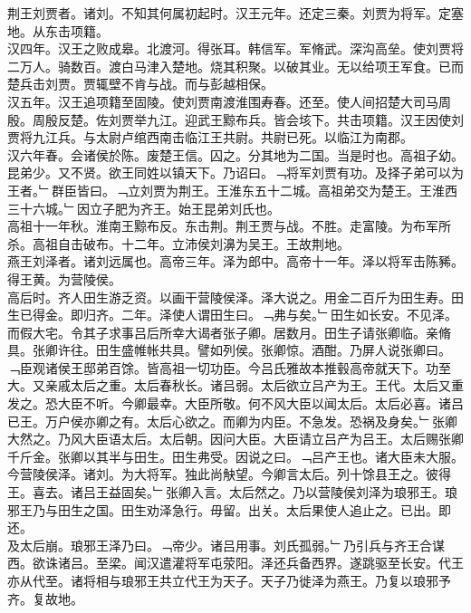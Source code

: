 \documentclass{zhvt-classic}
\begin{document}
\hspace*{2em}荆王刘贾者。诸刘。不知其何属初起时。汉王元年。还定三秦。刘贾为将军。定塞地。从东击项籍。\\
\hspace*{2em}汉四年。汉王之败成皋。北渡河。得张耳。韩信军。军脩武。深沟高垒。使刘贾将二万人。骑数百。渡白马津入楚地。烧其积聚。以破其业。无以给项王军食。已而楚兵击刘贾。贾辄壁不肯与战。而与彭越相保。\\
\hspace*{2em}汉五年。汉王追项籍至固陵。使刘贾南渡淮围寿春。还至。使人间招楚大司马周殷。周殷反楚。佐刘贾举九江。迎武王黥布兵。皆会垓下。共击项籍。汉王因使刘贾将九江兵。与太尉卢绾西南击临江王共尉。共尉已死。以临江为南郡。\\
\hspace*{2em}汉六年春。会诸侯於陈。废楚王信。囚之。分其地为二国。当是时也。高祖子幼。昆弟少。又不贤。欲王同姓以镇天下。乃诏曰。﹁将军刘贾有功。及择子弟可以为王者。﹂群臣皆曰。﹁立刘贾为荆王。王淮东五十二城。高祖弟交为楚王。王淮西三十六城。﹂因立子肥为齐王。始王昆弟刘氏也。\\
\hspace*{2em}高祖十一年秋。淮南王黥布反。东击荆。荆王贾与战。不胜。走富陵。为布军所杀。高祖自击破布。十二年。立沛侯刘濞为吴王。王故荆地。\\
\hspace*{2em}燕王刘泽者。诸刘远属也。高帝三年。泽为郎中。高帝十一年。泽以将军击陈豨。得王黄。为营陵侯。\\
\hspace*{2em}高后时。齐人田生游乏资。以画干营陵侯泽。泽大说之。用金二百斤为田生寿。田生已得金。即归齐。二年。泽使人谓田生曰。﹁弗与矣。﹂田生如长安。不见泽。而假大宅。令其子求事吕后所幸大谒者张子卿。居数月。田生子请张卿临。亲脩具。张卿许往。田生盛帷帐共具。譬如列侯。张卿惊。酒酣。乃屏人说张卿曰。﹁臣观诸侯王邸弟百馀。皆高祖一切功臣。今吕氏雅故本推毂高帝就天下。功至大。又亲戚太后之重。太后春秋长。诸吕弱。太后欲立吕产为王。王代。太后又重发之。恐大臣不听。今卿最幸。大臣所敬。何不风大臣以闻太后。太后必喜。诸吕已王。万户侯亦卿之有。太后心欲之。而卿为内臣。不急发。恐祸及身矣。﹂张卿大然之。乃风大臣语太后。太后朝。因问大臣。大臣请立吕产为吕王。太后赐张卿千斤金。张卿以其半与田生。田生弗受。因说之曰。﹁吕产王也。诸大臣未大服。今营陵侯泽。诸刘。为大将军。独此尚觖望。今卿言太后。列十馀县王之。彼得王。喜去。诸吕王益固矣。﹂张卿入言。太后然之。乃以营陵侯刘泽为琅邪王。琅邪王乃与田生之国。田生劝泽急行。毋留。出关。太后果使人追止之。已出。即还。\\
\hspace*{2em}及太后崩。琅邪王泽乃曰。﹁帝少。诸吕用事。刘氏孤弱。﹂乃引兵与齐王合谋西。欲诛诸吕。至梁。闻汉遣灌将军屯荥阳。泽还兵备西界。遂跳驱至长安。代王亦从代至。诸将相与琅邪王共立代王为天子。天子乃徙泽为燕王。乃复以琅邪予齐。复故地。\\
\end{document}

